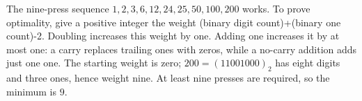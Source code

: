 The nine-press sequence $1,2,3,6,12,24,25,50,100,200$ works. To prove optimality, give a positive integer the weight (binary digit count)+(binary one count)-2. Doubling increases this weight by one. Adding one increases it by at most one: a carry replaces trailing ones with zeros, while a no-carry addition adds just one one. The starting weight is zero; $200=(11001000)_2$ has eight digits and three ones, hence weight nine. At least nine presses are required, so the minimum is $\boxed9$.
